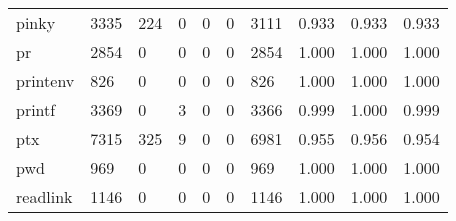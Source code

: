 \begin{longtable}{lp{1.3cm}p{1.3cm}p{1.3cm}p{1.3cm}p{1.3cm}p{1.3cm}p{1.3cm}p{1.3cm}p{1.3cm}}
pinky     &                   3335 &                                224 &                                 0 &                                0 &                                 0 &                            3111 &                                   0.933 &                                  0.933 &                                0.933 \\
pr        &                   2854 &                                  0 &                                 0 &                                0 &                                 0 &                            2854 &                                   1.000 &                                  1.000 &                                1.000 \\
printenv  &                    826 &                                  0 &                                 0 &                                0 &                                 0 &                             826 &                                   1.000 &                                  1.000 &                                1.000 \\
printf    &                   3369 &                                  0 &                                 3 &                                0 &                                 0 &                            3366 &                                   0.999 &                                  1.000 &                                0.999 \\
ptx       &                   7315 &                                325 &                                 9 &                                0 &                                 0 &                            6981 &                                   0.955 &                                  0.956 &                                0.954 \\
pwd       &                    969 &                                  0 &                                 0 &                                0 &                                 0 &                             969 &                                   1.000 &                                  1.000 &                                1.000 \\
readlink  &                   1146 &                                  0 &                                 0 &                                0 &                                 0 &                            1146 &                                   1.000 &                                  1.000 &                                1.000 \\

\end{longtable}

